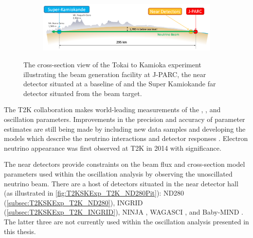 \begin{figure}[h]
  \begin{subfigure}[t]{0.95\textwidth}
    \includegraphics[width=\textwidth, trim={0mm 0mm 0mm 0mm}, clip,page=1]{Figures/Detectors/T2KCrossSection.pdf}
  \end{subfigure}
  \caption{The cross-section view of the Tokai to Kamioka experiment illustrating the beam generation facility at J-PARC, the near detector situated at a baseline of  and the Super Kamiokande far detector situated  from the beam target.}
  \label{fig:T2KSKExp_T2K_Overview}
\end{figure}

The T2K collaboration makes world-leading measurements of the , , and  oscillation parameters. Improvements in the precision and accuracy of parameter estimates are still being made by including new data samples and developing the models which describe the neutrino interactions and detector responses \cite{Bronner2022-wd}. Electron neutrino appearance was first observed at T2K in 2014 \cite{2014_Abe_ElectronNuApp} with \quickmath{7.3\sigma} significance.

The near detectors provide constraints on the beam flux and cross-section model parameters used within the oscillation analysis by observing the unoscillated neutrino beam. There are a host of detectors situated in the near detector hall (as illustrated in \autoref{fig:T2KSKExp_T2K_ND280Pit}): ND280 (\autoref{subsec:T2KSKExp_T2K_ND280}), INGRID (\autoref{subsec:T2KSKExp_T2K_INGRID}), NINJA \cite{ninja}, WAGASCI \cite{wagasci}, and Baby-MIND \cite{baby_mind}. The latter three are not currently used within the oscillation analysis presented in this thesis.

